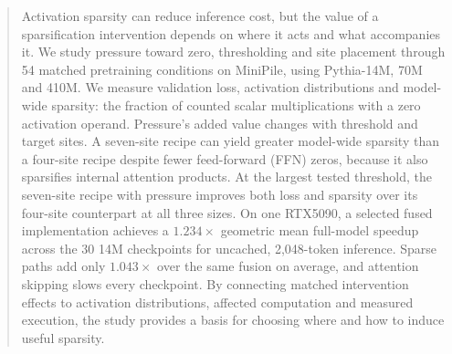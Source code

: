\begin{abstract}
Activation sparsity can reduce inference cost, but the value of a
sparsification intervention depends on where it acts and what accompanies it.
We study pressure toward zero, thresholding and site placement through
54 matched pretraining conditions on MiniPile, using Pythia-14M, 70M and
410M. We measure validation loss, activation
distributions and model-wide sparsity: the fraction of counted scalar multiplications
with a zero activation operand. Pressure's added value changes with threshold
and target sites. A seven-site recipe can yield greater model-wide sparsity
than a four-site recipe despite fewer feed-forward (FFN) zeros, because it also sparsifies
internal attention products. At the largest tested threshold, the seven-site
recipe with pressure improves both loss and sparsity over its four-site
counterpart at all three sizes. On one RTX5090, a selected fused implementation
achieves a $1.234\times$ geometric mean full-model speedup across the 30
14M checkpoints for uncached, 2,048-token inference. Sparse paths add only
$1.043\times$ over the same fusion on average, and attention skipping slows
every checkpoint. By connecting matched intervention effects to activation
distributions, affected computation and measured execution, the study provides
a basis for choosing where and how to induce useful sparsity.
\end{abstract}
